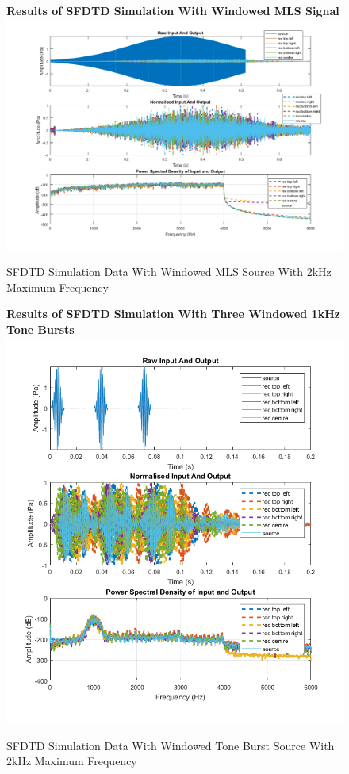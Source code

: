 \begin{figure}[H]
\centering
\textbf{Results of SFDTD Simulation With Windowed MLS Signal}
  \includegraphics[width=\textwidth]{./graphics/sfdtdMLS.png}
  \caption{SFDTD Simulation Data With Windowed MLS Source With 2kHz Maximum Frequency}
  \end{figure}
  \begin{figure}[H]
\centering
  \textbf{Results of SFDTD Simulation With Three Windowed 1kHz Tone Bursts}
  \includegraphics[width=\textwidth]{./graphics/SFDTDvalidationTB.png}
  \caption{SFDTD Simulation Data With Windowed Tone Burst Source With 2kHz Maximum Frequency}
\end{figure}


